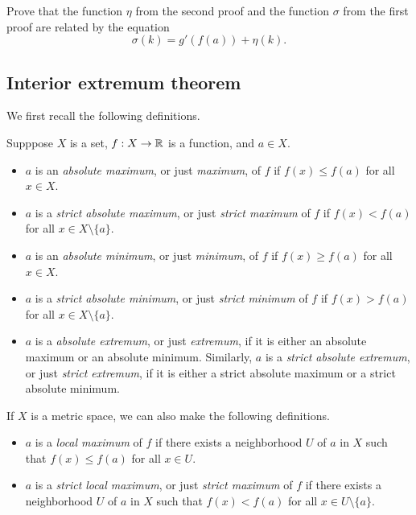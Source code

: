 \begin{exercise}
	Prove that the function $\eta$ from the second proof and the function $\sigma$ from the first proof are related by the equation
	\[ \sigma(k) = g'(f(a)) + \eta(k). \]
\end{exercise}

\subsection{Interior extremum theorem}

We first recall the following definitions. 

\begin{definition}      
	Supppose $X$ is a set, $f : X \to \mathbb{R}$ is a function, and $a \in X$. 
	\begin{itemize}
		\item $a$ is an \emph{absolute maximum}, or just \emph{maximum}, of $f$ if $f(x) \leq f(a)$ for all $x \in X$. 
		\item $a$ is a \emph{strict absolute maximum}, or just \emph{strict maximum} of $f$ if $f(x) < f(a)$ for all $x \in X \setminus\{a\}$. 
		\item $a$ is an \emph{absolute minimum}, or just \emph{minimum}, of $f$ if $f(x) \geq f(a)$ for all $x \in X$. 
		\item $a$ is a \emph{strict absolute minimum}, or just \emph{strict minimum} of $f$ if $f(x) > f(a)$ for all $x \in X \setminus\{a\}$. 
		\item $a$ is a \emph{absolute extremum}, or just \emph{extremum}, if it is either an absolute maximum or an absolute minimum. Similarly, $a$ is a \emph{strict absolute extremum}, or just \emph{strict extremum}, if it is either a strict absolute maximum or a strict absolute minimum. 
	\end{itemize}
	If $X$ is a metric space\footnotemark, we can also make the following definitions. 
	\begin{itemize}
		\item $a$ is a \emph{local maximum} of $f$ if there exists a neighborhood $U$ of $a$ in $X$ such that $f(x) \leq f(a)$ for all $x \in U$. 
		\item $a$ is a \emph{strict local maximum}, or just \emph{strict maximum} of $f$ if there exists a neighborhood $U$ of $a$ in $X$ such that $f(x) < f(a)$ for all $x \in U \setminus\{a\}$. 

\end{itemize}
\end{definition}
